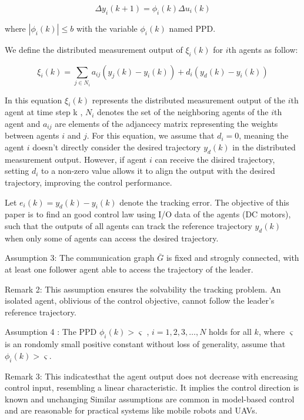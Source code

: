 \documentclass[journal,onecolumn]{IEEEtran}
\begin{document}
\begin{equation}
    \label{model 2}
    \Delta y_i(k+1)=\phi_i(k)\Delta u_i(k)
\end{equation}

where \( | \phi_i(k) | \leq b\) with the variable \(\phi_i(k)\) named PPD.

We define the distributed measurement output of \(\xi_i(k)\) for $i$th agents as follow:

\begin{equation}
    \label{model 3}
    \xi_i(k) = \sum_{j \in N_i} a_{ij}( y_j(k)-y_i(k)) + d_i(y_d(k) - y_i(k ))
\end{equation}

 
In this equation \(\xi_i(k)\) represents the distributed measurement output of the $i$th agent at time step k , \(N_i\) denotes the set of the neighboring agents of the $i$th agent and \(a_{ij}\) are elements of the adjancecy matrix representing the weights between agents \(i\) and \(j\).   
For this equation, we assume that \(d_i = 0\), meaning the agent \(i\) doesn't directly consider the desired trajectory \(y_d(k)\) in the distributed measurement output. However, if agent \(i\) can receive the disired trajectory, setting \(d_i\) to a non-zero value allows it to align the output with the desired trajectory, improving the control performance.


Let \(e_i(k) = y_d(k) - y_i(k)\) denote the tracking error. The objective of this paper is to find an good control law using I/O data of the agents (DC motors), such that the outputs of all agents can track the reference trajectory \(y_d(k)\) when only some of agents can access the desired trajectory.

Assumption 3: The communication graph $\bar{G}$ is fixed and strognly connected, with at least one follower agent able to access the trajectory of the leader.

Remark 2: This assumption ensures the solvability the tracking problem. An isolated agent, oblivious of the control objective, cannot follow the leader's reference trajectory.

Assumption 4 : The PPD \(\phi_i(k) > \varsigma\) , \(i = 1,2,3, \dots, N\) holds for all \(k\), where \( \varsigma \) is an rondomly small positive constant without loss of generality, assume that \(\phi_i(k) > \varsigma\).

Remark 3: This indicatesthat the agent output does not decrease with encreasing control input, resembling a linear characteristic. It implies the control direction is known and unchanging Similar assumptions are common in model-based control and are reasonable for practical systems like mobile robots and UAVs.
\end{document}
